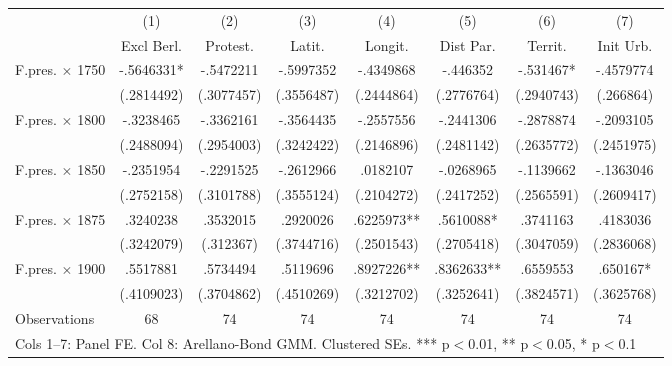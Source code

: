 \begin{adjustbox}{max width=\textwidth}
\begin{tabular}{lccccccc}
\toprule
 & (1) & (2) & (3) & (4) & (5) & (6) & (7) \\
 & Excl Berl. & Protest. & Latit. & Longit. & Dist Par. & Territ. & Init Urb. \\
\midrule
F.pres. $\times$ 1750 & -.5646331* & -.5472211 & -.5997352 & -.4349868 & -.446352 & -.531467* & -.4579774 \\
 & (.2814492) & (.3077457) & (.3556487) & (.2444864) & (.2776764) & (.2940743) & (.266864) \\[0.3em]
F.pres. $\times$ 1800 & -.3238465 & -.3362161 & -.3564435 & -.2557556 & -.2441306 & -.2878874 & -.2093105 \\
 & (.2488094) & (.2954003) & (.3242422) & (.2146896) & (.2481142) & (.2635772) & (.2451975) \\[0.3em]
F.pres. $\times$ 1850 & -.2351954 & -.2291525 & -.2612966 & .0182107 & -.0268965 & -.1139662 & -.1363046 \\
 & (.2752158) & (.3101788) & (.3555124) & (.2104272) & (.2417252) & (.2565591) & (.2609417) \\[0.3em]
F.pres. $\times$ 1875 & .3240238 & .3532015 & .2920026 & .6225973** & .5610088* & .3741163 & .4183036 \\
 & (.3242079) & (.312367) & (.3744716) & (.2501543) & (.2705418) & (.3047059) & (.2836068) \\[0.3em]
F.pres. $\times$ 1900 & .5517881 & .5734494 & .5119696 & .8927226** & .8362633** & .6559553 & .650167* \\
 & (.4109023) & (.3704862) & (.4510269) & (.3212702) & (.3252641) & (.3824571) & (.3625768) \\[0.3em]
\midrule
Observations & 68 & 74 & 74 & 74 & 74 & 74 & 74 \\
\bottomrule
\multicolumn{8}{l}{\footnotesize Cols 1--7: Panel FE. Col 8: Arellano-Bond GMM. Clustered SEs. *** p$<$0.01, ** p$<$0.05, * p$<$0.1} \\
\end{tabular}
\end{adjustbox}
